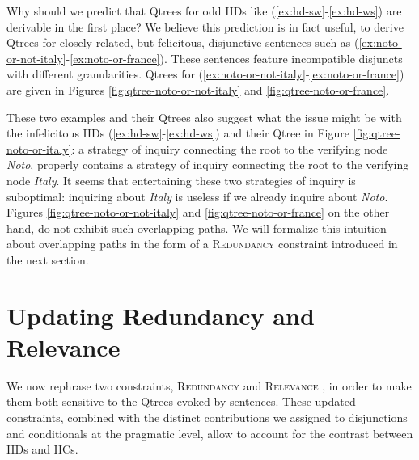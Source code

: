 Why should we predict that Qtrees for odd HDs like (\ref{ex:hd-sw}-\ref{ex:hd-ws}) are derivable in the first place? We believe this prediction is in fact useful, to derive Qtrees for closely related, but felicitous, disjunctive sentences such as (\ref{ex:noto-or-not-italy}-\ref{ex:noto-or-france}). These sentences feature incompatible disjuncts with different granularities. Qtrees for (\ref{ex:noto-or-not-italy}-\ref{ex:noto-or-france}) are given in Figures \ref{fig:qtree-noto-or-not-italy} and \ref{fig:qtree-noto-or-france}.
\begin{exe}
\ex 
\begin{xlist}
	\label{ex:noto-or-not-italy}
	\label{ex:noto-or-france}
\end{xlist}
\end{exe}
These two examples and their Qtrees also suggest what the issue might be with the infelicitous HDs (\ref{ex:hd-sw}-\ref{ex:hd-ws}) and their Qtree in Figure \ref{fig:qtree-noto-or-italy}: a strategy of inquiry connecting the root to the verifying node \textit{Noto}, properly contains a strategy of inquiry connecting the root to the verifying node \textit{Italy}. It seems that entertaining these two strategies of inquiry is suboptimal: inquiring about \textit{Italy} is useless if we already inquire about \textit{Noto}. Figures \ref{fig:qtree-noto-or-not-italy} and \ref{fig:qtree-noto-or-france} on the other hand, do not exhibit such overlapping paths. We will formalize this intuition about overlapping paths in the form of a \textsc{Redundancy} constraint introduced in the next section.


\section{Updating Redundancy and Relevance}\label{sec:constraints}
We now rephrase two constraints, \textsc{Redundancy} \citep{Katzir2014} and \textsc{Relevance} \cite{Lewis1988}, in order to make them both sensitive to the Qtrees evoked by sentences. These updated constraints, combined with the distinct contributions we assigned to disjunctions and conditionals at the pragmatic level, allow to account for the contrast between HDs and HCs.
